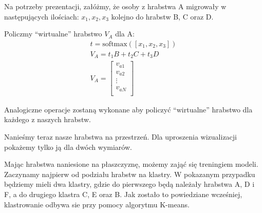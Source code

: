 \documentclass[a4paper,12pt]{article}
\newcommand{\softmax}{\mathrm{softmax}}
\begin{document}
Na potrzeby prezentacji, załóżmy, że osoby z hrabstwa A migrowały w następujących ilościach: $x_1, x_2, x_3$ kolejno do hrabstw B, C oraz D.

Policzmy ``wirtualne'' hrabstwo $V_A$ dla A:
\begin{equation}
    \begin{gathered}
        t = \softmax ([x_1, x_2, x_3]) \\
        V_A = t_1B + t_2C + t_3D \\
        V_A = \begin{bmatrix}
            v_{a1} \\
            v_{a2} \\
            \vdots \\
            v_{aN} \\
        \end{bmatrix}
    \end{gathered}
\end{equation}

Analogiczne operacje zostaną wykonane aby policzyć ``wirtualne'' hrabstwo dla każdego z naszych hrabstw.

Nanieśmy teraz nasze hrabstwa na przestrzeń. Dla uproszenia wizualizacji pokażemy tylko ją dla dwóch wymiarów.

\begin{center}
\end{center}

Mając hrabstwa naniesione na płaszczyznę, możemy zająć się treningiem modeli. Zaczynamy najpierw od podziału hrabstw na klastry. W pokazanym przypadku będziemy mieli dwa klastry, gdzie do pierwszego będą należały hrabstwa A, D i F, a do drugiego klastra C, E oraz B. Jak zostało to powiedziane wcześniej, klastrowanie odbywa sie przy pomocy algorytmu K-means.
\end{document}
